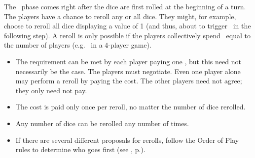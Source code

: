 The \diplomacy\ phase comes right after the dice are first rolled at the beginning of a turn.  The players have a chance to reroll any or all dice.  They might, for example, choose to reroll all dice displaying a value of 1 (and thus, about to trigger \disasters\ in the following step).  A reroll is only possible if the players collectively spend \currency\ equal to the number of players (e.g. \spendcurrency\spendcurrency\spendcurrency\spendcurrency\ in a 4-player game).
\begin{itemize}
  \item The requirement can be met by each player paying one \currency, but this need not necessarily be the case.  The players must negotiate.  Even one player alone may perform a reroll by paying the cost.  The other players need not agree; they only need not pay.
  \item The cost is paid only once per reroll, no matter the number of dice rerolled.
  \item Any number of dice can be rerolled any number of times.
  \item If there are several different proposals for rerolls, follow the Order of Play rules to determine who goes first (see , p.\pageref{sec:order}).
\end{itemize}
